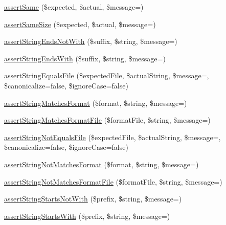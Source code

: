 \begin{DoxyCompactItemize}
\mbox{\hyperlink{_functions_8php_ac5f885920db6f99b78803ff527f185f4}{assert\+Same}} (\$expected, \$actual, \$message=\textquotesingle{}\textquotesingle{})
\item 
\mbox{\hyperlink{_functions_8php_a6a8c63741621b0458fdf8e60347e8482}{assert\+Same\+Size}} (\$expected, \$actual, \$message=\textquotesingle{}\textquotesingle{})
\item 
\mbox{\hyperlink{_functions_8php_a4d67586cf3a83e0261a2757cbaf80660}{assert\+String\+Ends\+Not\+With}} (\$suffix, \$string, \$message=\textquotesingle{}\textquotesingle{})
\item 
\mbox{\hyperlink{_functions_8php_a17b4d6a9e2b1720176372965fa2f2433}{assert\+String\+Ends\+With}} (\$suffix, \$string, \$message=\textquotesingle{}\textquotesingle{})
\item 
\mbox{\hyperlink{_functions_8php_af0bfdb5d749c1a35f611b40914c98ce2}{assert\+String\+Equals\+File}} (\$expected\+File, \$actual\+String, \$message=\textquotesingle{}\textquotesingle{}, \$canonicalize=false, \$ignore\+Case=false)
\item 
\mbox{\hyperlink{_functions_8php_ae34aeb4354dbd2a41bf2a423f7817d66}{assert\+String\+Matches\+Format}} (\$format, \$string, \$message=\textquotesingle{}\textquotesingle{})
\item 
\mbox{\hyperlink{_functions_8php_a50aaadb1e7c22364b730e51e81ec612b}{assert\+String\+Matches\+Format\+File}} (\$format\+File, \$string, \$message=\textquotesingle{}\textquotesingle{})
\item 
\mbox{\hyperlink{_functions_8php_adad8e94c871f6383e9abcea8af8bfcde}{assert\+String\+Not\+Equals\+File}} (\$expected\+File, \$actual\+String, \$message=\textquotesingle{}\textquotesingle{}, \$canonicalize=false, \$ignore\+Case=false)
\item 
\mbox{\hyperlink{_functions_8php_aeaa5a3ca2c1c1139727c0216ffb6fa77}{assert\+String\+Not\+Matches\+Format}} (\$format, \$string, \$message=\textquotesingle{}\textquotesingle{})
\item 
\mbox{\hyperlink{_functions_8php_aade9415f0929acd2b54c35ab975ad8cd}{assert\+String\+Not\+Matches\+Format\+File}} (\$format\+File, \$string, \$message=\textquotesingle{}\textquotesingle{})
\item 
\mbox{\hyperlink{_functions_8php_a0ef74d97ec4a6a2d7ae7e7f5ed08cf1e}{assert\+String\+Starts\+Not\+With}} (\$prefix, \$string, \$message=\textquotesingle{}\textquotesingle{})
\item 
\mbox{\hyperlink{_functions_8php_a907e1edd408b7146e817b81ed131deda}{assert\+String\+Starts\+With}} (\$prefix, \$string, \$message=\textquotesingle{}\textquotesingle{})

\end{DoxyCompactItemize}

